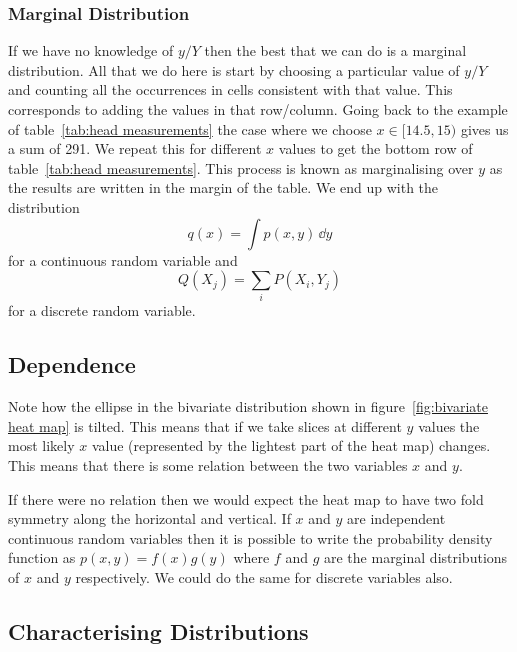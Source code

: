     \subsubsection{Marginal Distribution}
    If we have no knowledge of \(y/Y\) then the best that we can do is a marginal distribution.
    All that we do here is start by choosing a particular value of \(y/Y\) and counting all the occurrences in cells consistent with that value.
    This corresponds to adding the values in that row/column.
    Going back to the example of table~\ref{tab:head measurements} the case where we choose \(x \in [14.5, 15)\) gives us a sum of 291.
    We repeat this for different \(x\) values to get the bottom row of table~\ref{tab:head measurements}.
    This process is known as marginalising over \(y\) as the results are written in the margin of the table.
    We end up with the distribution
    \[q(x) = \int p(x, y)\,\dd{y}\]
    for a continuous random variable and
    \[Q(X_j) = \sum_{i} P(X_i, Y_j)\]
    for a discrete random variable.
    
    \subsection{Dependence}
    Note how the ellipse in the bivariate distribution shown in figure~\ref{fig:bivariate heat map} is tilted.
    This means that if we take slices at different \(y\) values the most likely \(x\) value (represented by the lightest part of the heat map) changes.
    This means that there is some relation between the two variables \(x\) and \(y\).
    
    If there were no relation then we would expect the heat map to have two fold symmetry along the horizontal and vertical.
    If \(x\) and \(y\) are independent continuous random variables then it is possible to write the probability density function as \(p(x, y) = f(x)g(y)\) where \(f\) and \(g\) are the marginal distributions of \(x\) and \(y\) respectively.
    We could do the same for discrete variables also.
    
    \subsection{Characterising Distributions}
